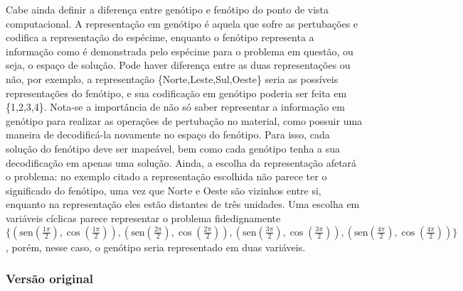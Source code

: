 Cabe ainda definir a diferença entre genótipo e fenótipo do ponto de
vista computacional. A representação em genótipo é aquela que sofre as
pertubações e codifica a representação do espécime, enquanto o
fenótipo representa a informação como é demonstrada pelo espécime para
o problema em questão, ou seja, o espaço de solução. Pode haver
diferença entre as duas representações ou não, por exemplo, a
representação \{Norte,Leste,Sul,Oeste\} seria as possíveis
representações do fenótipo, e sua codificação em genótipo poderia ser
feita em \{1,2,3,4\}. Nota-se a importância de não
só saber representar a informação em genótipo para realizar as
operações de pertubação no material, como possuir uma maneira de
decodificá-la novamente no espaço do fenótipo. Para isso, cada solução
do fenótipo deve ser mapeável, bem como cada genótipo tenha a sua
decodificação em apenas uma solução. Ainda, a escolha da representação
afetará o problema: no exemplo citado a representação escolhida
não parece ter o significado do fenótipo, uma vez que Norte e Oeste são
vizinhos entre si, enquanto na representação eles estão distantes de três
unidades. Uma escolha em variáveis cíclicas parece representar o
problema fidedignamente
$\{(\text{sen}(\frac{1\pi}{2}),\cos(\frac{1\pi}{2})),
(\text{sen}(\frac{2\pi}{2}),\cos(\frac{2\pi}{2})),
(\text{sen}(\frac{3\pi}{2}),\cos(\frac{3\pi}{2})),
(\text{sen}(\frac{4\pi}{2}),\cos(\frac{4\pi}{2}))\}$, porém, nesse
caso, o genótipo seria representado em duas variáveis.

\subsubsection{Versão original}

